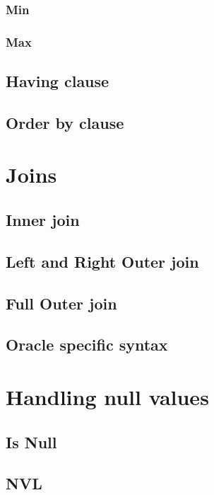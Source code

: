 \documentclass[12pt, letterpaper]{report}
\begin{document}
\subsection{Min}
\subsection{Max}

\section{Having clause}
\blindtext

\section{Order by clause}
\blindtext

\chapter{Joins}
\blindtext

\section{Inner join}
\blindtext

\section{Left and Right Outer join}
\blindtext

\section{Full Outer join}
\blindtext

\section{Oracle specific syntax}
\blindtext

\chapter{Handling null values}
\blindtext

\section{Is Null}
\blindtext

\section{NVL}
\blindtext
\end{document}
